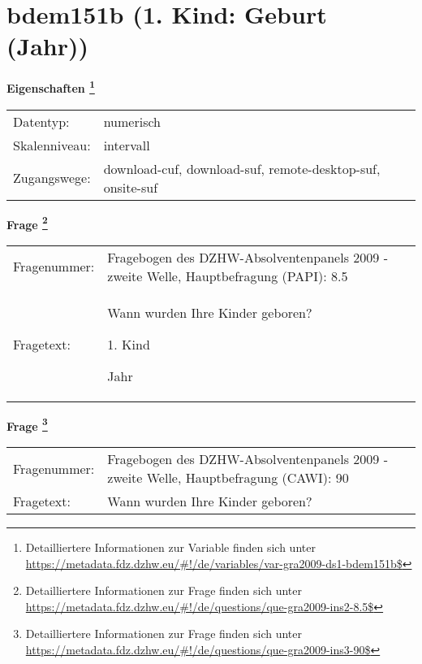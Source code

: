 
    \setcounter{footnote}{0}

    \vspace*{-1.8cm}
	\section{bdem151b (1. Kind: Geburt (Jahr))}
	\label{section:bdem151b}



    \vspace*{0.5cm}
    \noindent\textbf{Eigenschaften
	\footnote{Detailliertere Informationen zur Variable finden sich unter
		\url{https://metadata.fdz.dzhw.eu/\#!/de/variables/var-gra2009-ds1-bdem151b$}}}\\
	\begin{tabularx}{\hsize}{@{}lX}
	Datentyp: & numerisch \\
	Skalenniveau: & intervall \\
	Zugangswege: &
	  download-cuf, 
	  download-suf, 
	  remote-desktop-suf, 
	  onsite-suf
 \\
    \end{tabularx}



				\vspace*{0.5cm}
                \noindent\textbf{Frage
	                \footnote{Detailliertere Informationen zur Frage finden sich unter
		              \url{https://metadata.fdz.dzhw.eu/\#!/de/questions/que-gra2009-ins2-8.5$}}}\\
				\begin{tabularx}{\hsize}{@{}lX}
					Fragenummer: &
					  Fragebogen des DZHW-Absolventenpanels 2009 - zweite Welle, Hauptbefragung (PAPI):
					  8.5
 \\
					Fragetext: & Wann wurden Ihre Kinder geboren?\par  1. Kind\par  Jahr \\
				\end{tabularx}
				\vspace*{0.5cm}
                \noindent\textbf{Frage
	                \footnote{Detailliertere Informationen zur Frage finden sich unter
		              \url{https://metadata.fdz.dzhw.eu/\#!/de/questions/que-gra2009-ins3-90$}}}\\
				\begin{tabularx}{\hsize}{@{}lX}
					Fragenummer: &
					  Fragebogen des DZHW-Absolventenpanels 2009 - zweite Welle, Hauptbefragung (CAWI):
					  90
 \\
					Fragetext: & Wann wurden Ihre Kinder geboren? \\
				\end{tabularx}





